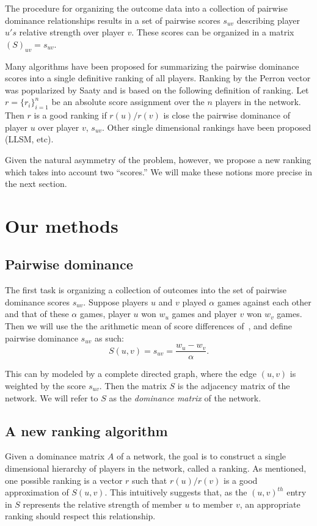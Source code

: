 \documentclass[a4,11pt,twoside,leqno]{report}
\theoremstyle{definition}
\theoremstyle{remark}
\numberwithin{equation}{section}
\begin{document}
The procedure for organizing the outcome data into a collection of pairwise
dominance relationships results in a set of pairwise scores $s_{uv}$ describing
player $u's$ relative strength over player $v$.  These scores can be organized
in a matrix $(S)_{uv} = s_{uv}$.

Many algorithms have been proposed for summarizing the pairwise dominance scores
into a single definitive ranking of all players.  Ranking by the Perron vector
was popularized by Saaty and is based on the following definition of ranking.
Let $r = \{r_i\}_{i=1}^n$ be an absolute score assignment over the $n$ players
in the network.  Then $r$ is a good ranking if $r(u)/r(v)$ is close the pairwise
dominance of player $u$ over player $v$, $s_{uv}$.  Other single dimensional
rankings have been proposed (LLSM, etc).

Given the natural asymmetry of the problem, however, we propose a new ranking
which takes into account two ``scores.'' We will make these notions more precise
in the next section.

\section{Our methods}\label{sec:methods}

\subsection{Pairwise dominance}
The first task is organizing a collection of outcomes into the set of pairwise
dominance scores $s_{uv}$.  Suppose players $u$ and $v$  played $\alpha$ games
against each other and that of these $\alpha$ games, player $u$ won $w_u$ games
and player $v$ won $w_v$ games.  Then we will use the the arithmetic mean of
score differences of~\cite{jiang:statistical:mp10}, and define pairwise
dominance $s_{uv}$ as such:
\begin{equation}\label{eq:suv}
S(u,v) = s_{uv} = \frac{w_u - w_v}{\alpha}.
\end{equation}

This can by modeled by a complete directed graph, where the edge $(u,v)$ is
weighted by the score $s_{uv}$.  Then the matrix $S$ is the adjacency matrix of
the network.  We will refer to $S$ as the \emph{dominance matrix} of the
network.

\subsection{A new ranking algorithm}
Given a dominance matrix $A$ of a network, the goal is to construct a single
dimensional hierarchy of players in the network, called a ranking.  As
mentioned, one possible ranking is a vector $r$ such that $r(u)/r(v)$ is a good
approximation of $S(u,v)$.  This intuitively suggests that, as the $(u,v)^{th}$
entry in $S$ represents the relative strength of member $u$ to member $v$, an
appropriate ranking should respect this relationship.
\end{document}
